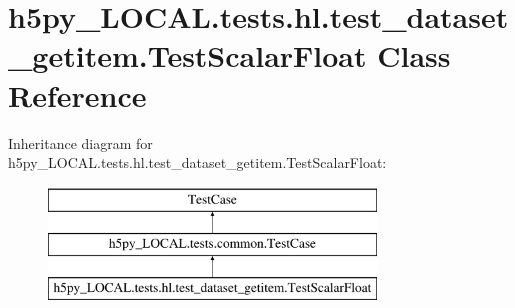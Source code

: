 \hypertarget{classh5py__LOCAL_1_1tests_1_1hl_1_1test__dataset__getitem_1_1TestScalarFloat}{}\section{h5py\+\_\+\+L\+O\+C\+A\+L.\+tests.\+hl.\+test\+\_\+dataset\+\_\+getitem.\+Test\+Scalar\+Float Class Reference}
\label{classh5py__LOCAL_1_1tests_1_1hl_1_1test__dataset__getitem_1_1TestScalarFloat}
Inheritance diagram for h5py\+\_\+\+L\+O\+C\+A\+L.\+tests.\+hl.\+test\+\_\+dataset\+\_\+getitem.\+Test\+Scalar\+Float\+:\begin{figure}[H]
\begin{center}
\leavevmode
\includegraphics[height=3.000000cm]{classh5py__LOCAL_1_1tests_1_1hl_1_1test__dataset__getitem_1_1TestScalarFloat}
\end{center}
\end{figure}
